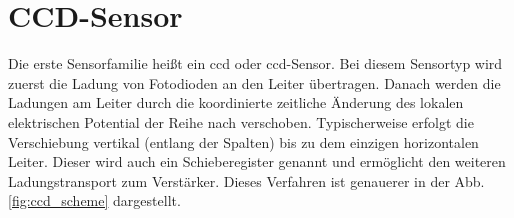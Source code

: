 \section{CCD-Sensor}
\label{text:ccd_theorie}
Die erste Sensorfamilie heißt ein \gls{ccd} oder \gls{ccd}-Sensor. Bei diesem Sensortyp wird zuerst die Ladung von Fotodioden an den Leiter übertragen. Danach werden die Ladungen am Leiter durch die koordinierte zeitliche Änderung des lokalen elektrischen Potential der Reihe nach verschoben. Typischerweise erfolgt die Verschiebung vertikal (entlang der Spalten) bis zu dem einzigen horizontalen Leiter. Dieser wird auch ein Schieberegister genannt und ermöglicht den weiteren Ladungstransport zum Verstärker. Dieses Verfahren ist genauerer in der Abb. \ref{fig:ccd_scheme} dargestellt.
\begin{figure}[H]
    \centering

\end{figure}
